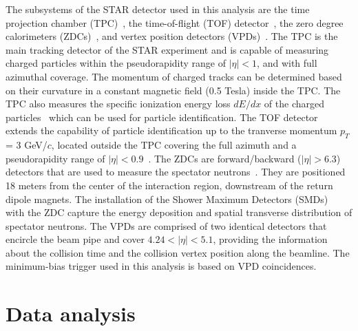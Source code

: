 \documentclass[preprint,5p,times,twocolumn]{elsarticle}
\begin{document}
The subsystems of the STAR detector used in this analysis are the time projection chamber (TPC)~\cite{Anderson:2003ur}, the time-of-flight (TOF) detector~\cite{Llope:2012zz},  the zero degree calorimeters (ZDCs)~\cite{Adler:2001fq}, and vertex position detectors (VPDs)~\cite{Llope:2014nva}. 
The TPC is the main tracking detector of the STAR experiment and is capable of measuring charged particles within the pseudorapidity range of $|\eta|<1$, and with full azimuthal coverage. 
The momentum of charged tracks can be determined based on their curvature in a constant magnetic field (0.5 Tesla) inside the TPC. The TPC also measures the specific ionization energy loss $dE/dx$ of the charged particles~\cite{Anderson:2003ur} which can be used for particle identification. 
The TOF detector extends the capability of particle identification up to the tranverse momentum $p_T$ = 3 GeV/$c$, located outside the TPC covering the full azimuth and a pseudorapidity range of $|\eta| < 0.9$~\cite{Llope:2012zz}. 
The ZDCs are forward/backward ($|\eta| > 6.3$) detectors that are used to measure the spectator neutrons~\cite{Adler:2001fq}. 
They are positioned 18 meters from the center of the interaction region, downstream of the return dipole magnets.
The installation of the Shower Maximum Detectors (SMDs)~\cite{SMD} with the ZDC capture the energy deposition and spatial transverse distribution of spectator neutrons. %
The VPDs are comprised of two identical detectors that encircle the beam pipe and cover \(4.24 < |\eta| < 5.1\), providing the information about the collision time and the collision vertex position along the beamline. 
The minimum-bias trigger used in this analysis is based on VPD coincidences.


\section{Data analysis}
\end{document}

